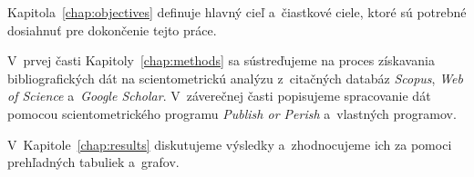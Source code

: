 Kapitola~\ref{chap:objectives} definuje hlavný cieľ a~čiastkové ciele, ktoré sú
potrebné dosiahnuť pre dokončenie tejto práce.

V~prvej časti Kapitoly~\ref{chap:methods} sa sústreďujeme na proces získavania
bibliografických dát na scientometrickú analýzu z~citačných databáz
\emph{Scopus}, \emph{Web of Science} a~\emph{Google Scholar}.  V~záverečnej
časti popisujeme spracovanie dát pomocou scientometrického programu
\emph{Publish or Perish} a~vlastných programov.

V~Kapitole~\ref{chap:results} diskutujeme výsledky a~zhodnocujeme ich za pomoci
prehľadných tabuliek a~grafov.

